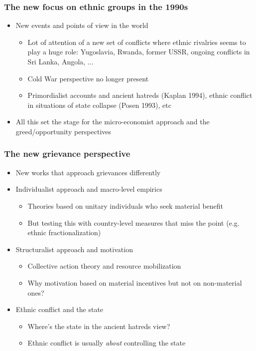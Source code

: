 \documentclass[aspectratio=43]{beamer}
\begin{document}
\begin{frame}
\frametitle{The new focus on ethnic groups in the 1990s}
\centering

\begin{itemize}[<+->]
  \item New events and points of view in the world
  \begin{itemize}
    \item Lot of attention of a new set of conflicts where ethnic rivalries seems to play a huge role: Yugoslavia, Rwanda, former USSR, ongoing conflicts in Sri Lanka, Angola, ...
    \item Cold War perspective no longer present
    \item Primordialist accounts and ancient hatreds (Kaplan 1994), ethnic conflict in situations of state collapse (Posen 1993), etc
  \end{itemize}
  \item All this set the stage for the micro-economist approach and the greed/opportunity perspectives
\end{itemize}

\end{frame}

\begin{frame}
\frametitle{The new grievance perspective}
\centering

\begin{itemize}
  \item<2-> New works that approach grievances differently
  \item<3-> Individualist approach and macro-level empirics
  \begin{itemize}
    \item Theories based on unitary individuals who seek material benefit
    \item But testing this with country-level measures that miss the point (e.g. ethnic fractionalization)
  \end{itemize}
  \item<4-> Structuralist approach and motivation
  \begin{itemize}
    \item Collective action theory and resource mobilization
    \item Why motivation based on material incentives but not on non-material ones?
  \end{itemize}
  \item<5-> Ethnic conflict and the state
  \begin{itemize}
    \item Where's the state in the ancient hatreds view?
    \item Ethnic conflict is usually \textit{about} controlling the state
  \end{itemize}
\end{itemize}

\end{frame}
\end{document}
